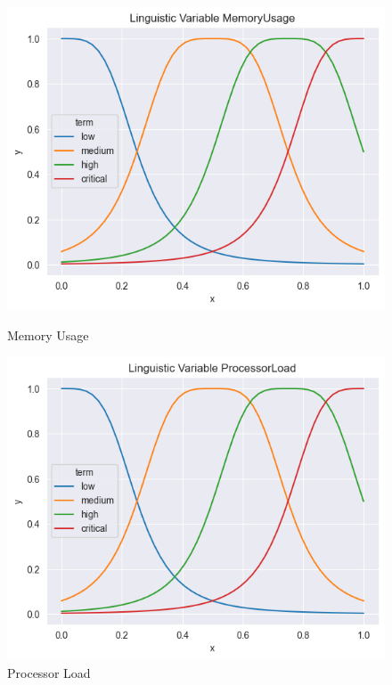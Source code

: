 \documentclass[titlepage]{article}
\begin{document}
\begin{figure}[htbp]
    \centering
    \begin{minipage}{0.32\textwidth}
        \centering
        \includegraphics[width=\textwidth]{../images/first_bell/MemoryUsage}
        \caption{Memory Usage}
        \label{fig:first_bell_processor_load}
    \end{minipage}
    \hfill
    \begin{minipage}{0.32\textwidth}
        \centering
        \includegraphics[width=\textwidth]{../images/first_bell/ProcessorLoad}
        \caption{Processor Load}
        \label{fig:first_bell_memory_usage}

\end{minipage}
\end{figure}
\end{document}
